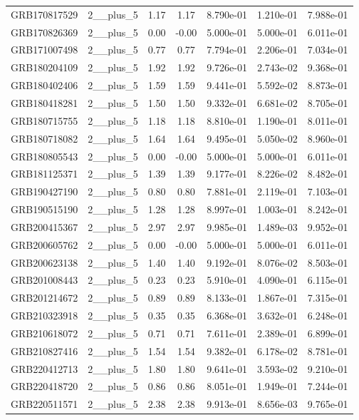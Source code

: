 \documentclass[12pt]{article}
\begin{document}
\begin{table}[h!]
{\begin{tabular}{l c c c c c c}
GRB170817529 & 2__plus_5 & 1.17 & 1.17 & 8.790e-01 & 1.210e-01 & 7.988e-01 \\
GRB170826369 & 2__plus_5 & 0.00 & -0.00 & 5.000e-01 & 5.000e-01 & 6.011e-01 \\
GRB171007498 & 2__plus_5 & 0.77 & 0.77 & 7.794e-01 & 2.206e-01 & 7.034e-01 \\
GRB180204109 & 2__plus_5 & 1.92 & 1.92 & 9.726e-01 & 2.743e-02 & 9.368e-01 \\
GRB180402406 & 2__plus_5 & 1.59 & 1.59 & 9.441e-01 & 5.592e-02 & 8.873e-01 \\
GRB180418281 & 2__plus_5 & 1.50 & 1.50 & 9.332e-01 & 6.681e-02 & 8.705e-01 \\
GRB180715755 & 2__plus_5 & 1.18 & 1.18 & 8.810e-01 & 1.190e-01 & 8.011e-01 \\
GRB180718082 & 2__plus_5 & 1.64 & 1.64 & 9.495e-01 & 5.050e-02 & 8.960e-01 \\
GRB180805543 & 2__plus_5 & 0.00 & -0.00 & 5.000e-01 & 5.000e-01 & 6.011e-01 \\
GRB181125371 & 2__plus_5 & 1.39 & 1.39 & 9.177e-01 & 8.226e-02 & 8.482e-01 \\
GRB190427190 & 2__plus_5 & 0.80 & 0.80 & 7.881e-01 & 2.119e-01 & 7.103e-01 \\
GRB190515190 & 2__plus_5 & 1.28 & 1.28 & 8.997e-01 & 1.003e-01 & 8.242e-01 \\
GRB200415367 & 2__plus_5 & 2.97 & 2.97 & 9.985e-01 & 1.489e-03 & 9.952e-01 \\
GRB200605762 & 2__plus_5 & 0.00 & -0.00 & 5.000e-01 & 5.000e-01 & 6.011e-01 \\
GRB200623138 & 2__plus_5 & 1.40 & 1.40 & 9.192e-01 & 8.076e-02 & 8.503e-01 \\
GRB201008443 & 2__plus_5 & 0.23 & 0.23 & 5.910e-01 & 4.090e-01 & 6.115e-01 \\
GRB201214672 & 2__plus_5 & 0.89 & 0.89 & 8.133e-01 & 1.867e-01 & 7.315e-01 \\
GRB210323918 & 2__plus_5 & 0.35 & 0.35 & 6.368e-01 & 3.632e-01 & 6.248e-01 \\
GRB210618072 & 2__plus_5 & 0.71 & 0.71 & 7.611e-01 & 2.389e-01 & 6.899e-01 \\
GRB210827416 & 2__plus_5 & 1.54 & 1.54 & 9.382e-01 & 6.178e-02 & 8.781e-01 \\
GRB220412713 & 2__plus_5 & 1.80 & 1.80 & 9.641e-01 & 3.593e-02 & 9.210e-01 \\
GRB220418720 & 2__plus_5 & 0.86 & 0.86 & 8.051e-01 & 1.949e-01 & 7.244e-01 \\
GRB220511571 & 2__plus_5 & 2.38 & 2.38 & 9.913e-01 & 8.656e-03 & 9.765e-01 \\

\end{tabular}}
\end{table}
\end{document}
